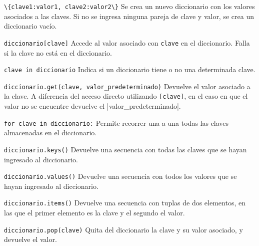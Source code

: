 \begin{referencia_python}

\begin{sintaxis}{\lstinline!\{clave1:valor1, clave2:valor2\}!}
Se crea un nuevo diccionario con los valores asociados a las claves.  Si no
se ingresa ninguna pareja de clave y valor, se crea un diccionario vacío.
\end{sintaxis}

\begin{sintaxis}{\lstinline{diccionario[clave]}}
Accede al valor asociado con \lstinline!clave! en el diccionario. Falla si la
clave no está en el diccionario.
\end{sintaxis}

\begin{sintaxis}{\lstinline{clave in diccionario}}
Indica si un diccionario tiene o no una determinada clave.
\end{sintaxis}

\begin{sintaxis}{\lstinline{diccionario.get(clave, valor_predeterminado)}}
Devuelve el valor asociado a la clave.  A diferencia del acceso directo
utilizando \lstinline{[clave]}, en el caso en que el valor no se
encuentre devuelve el |valor_predeterminado|.
\end{sintaxis}

\begin{sintaxis}{\lstinline{for clave in diccionario:}}
Permite recorrer una a una todas las claves almacenadas en
el diccionario.
\end{sintaxis}

\begin{sintaxis}{\lstinline{diccionario.keys()}}
Devuelve una secuencia con todas las claves que se hayan ingresado
al diccionario.
\end{sintaxis}

\begin{sintaxis}{\lstinline{diccionario.values()}}
Devuelve una secuencia con todos los valores que se hayan
ingresado al diccionario.
\end{sintaxis}

\begin{sintaxis}{\lstinline{diccionario.items()}}
Devuelve una secuencia con tuplas de dos elementos, en las que el
primer elemento es la clave y el segundo el valor.
\end{sintaxis}

\begin{sintaxis}{\lstinline{diccionario.pop(clave)}}
Quita del diccionario la clave y su valor asociado, y devuelve el valor.
\end{sintaxis}
\end{referencia_python}


